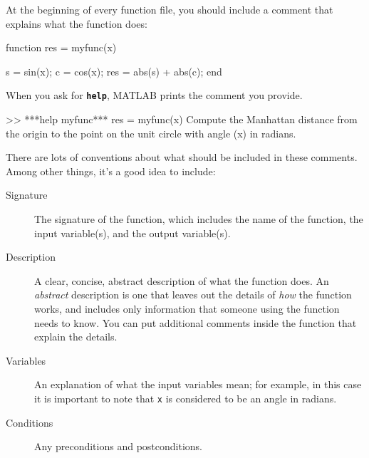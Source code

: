 
At the beginning of every function file, you should include a comment
that explains what the function does:


\begin{code}

function res = myfunc(x)

    s = sin(x);
    c = cos(x);
    res = abs(s) + abs(c);
end
\end{code}

When you ask for \textbf{\lstinline{help}}, MATLAB prints the comment you provide.


\begin{code}
>> ***help myfunc***
  res = myfunc(x)
  Compute the Manhattan distance from the origin to the
  point on the unit circle with angle (x) in radians.
\end{code}

There are lots of conventions about what should be included
in these comments.  Among other things, it's a good idea to
include:

\begin{description}

\item [Signature] The signature of the function, which includes the name
of the function, the input variable(s), and the output variable(s).

\item [Description] A clear, concise, abstract description of what the function does.
An {\em abstract} description is one that leaves out the
details of {\em how} the function works, and includes only information
that someone using the function needs to know.  You can put additional
comments inside the function that explain the details.

\item [Variables] An explanation of what the input variables mean; for example,
in this case it is important to note that \lstinline{x} is considered
to be an angle in radians.

\item [Conditions] Any preconditions and postconditions.

\end{description}

